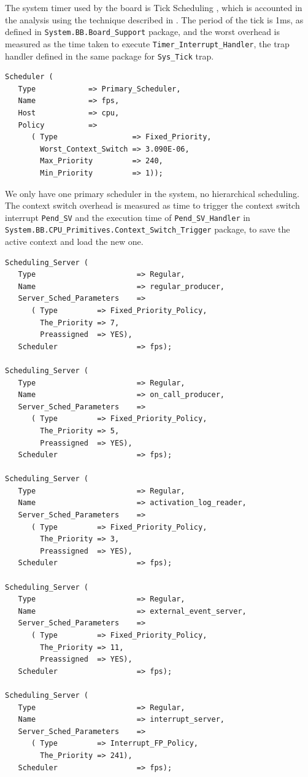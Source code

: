 \documentclass{article}
\begin{document}
The system timer used by the board is Tick Scheduling \cite{tick-scheduling}, which is accounted in the analysis using the technique described in \cite{effects-runtime}. The period of the tick is 1ms, as defined in \texttt{System.BB.Board\_Support} package, and the worst overhead is measured as the time taken to execute \texttt{Timer\_Interrupt\_Handler}, the trap handler defined in the same package for \texttt{Sys\_Tick} trap.

\begin{lstlisting}
Scheduler (
   Type            => Primary_Scheduler,
   Name            => fps,
   Host            => cpu,
   Policy          =>
      ( Type                 => Fixed_Priority,
        Worst_Context_Switch => 3.090E-06,
        Max_Priority         => 240,
        Min_Priority         => 1));
\end{lstlisting}

We only have one primary scheduler in the system, no hierarchical scheduling. The context switch overhead is measured as time to trigger the context switch interrupt \texttt{Pend\_SV} and the execution time of \texttt{Pend\_SV\_Handler} in \texttt{System.BB.CPU\_Primitives.Context\_Switch\_Trigger} package, to save the active context and load the new one.

\begin{lstlisting}
Scheduling_Server (
   Type                       => Regular,
   Name                       => regular_producer,
   Server_Sched_Parameters    =>
      ( Type         => Fixed_Priority_Policy,
        The_Priority => 7,
        Preassigned  => YES),
   Scheduler                  => fps);

Scheduling_Server (
   Type                       => Regular,
   Name                       => on_call_producer,
   Server_Sched_Parameters    =>
      ( Type         => Fixed_Priority_Policy,
        The_Priority => 5,
        Preassigned  => YES),
   Scheduler                  => fps);

Scheduling_Server (
   Type                       => Regular,
   Name                       => activation_log_reader,
   Server_Sched_Parameters    =>
      ( Type         => Fixed_Priority_Policy,
        The_Priority => 3,
        Preassigned  => YES),
   Scheduler                  => fps);

Scheduling_Server (
   Type                       => Regular,
   Name                       => external_event_server,
   Server_Sched_Parameters    =>
      ( Type         => Fixed_Priority_Policy,
        The_Priority => 11,
        Preassigned  => YES),
   Scheduler                  => fps);

Scheduling_Server (
   Type                       => Regular,
   Name                       => interrupt_server,
   Server_Sched_Parameters    =>
      ( Type         => Interrupt_FP_Policy,
        The_Priority => 241),
   Scheduler                  => fps);
\end{lstlisting}
\end{document}
